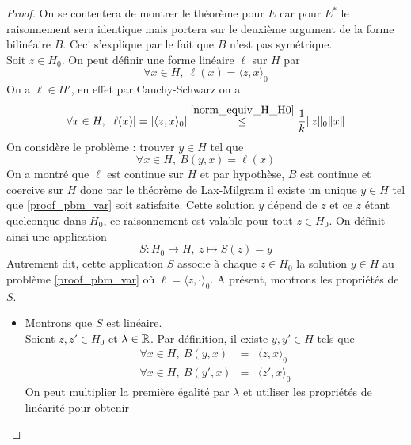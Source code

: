 \begin{appendices}
\begin{proof}
    On se contentera de montrer le théorème pour $E$ car pour $E^*$ le raisonnement sera identique mais portera sur le deuxième argument de la forme bilinéaire $B$. Ceci s'explique par le fait que $B$ n'est pas symétrique.
    \\
    Soit $z \in H_0$. On peut définir une forme linéaire $\ell$ sur $H$ par 
    \begin{equation*}
        \forall x \in H, \ \ell(x) = \langle z, x \rangle_0
    \end{equation*}
    On a $\ell \in H'$, en effet par Cauchy-Schwarz on a 
    \begin{equation*}
        \forall x \in H, \ |\ell(x)| = |\langle z, x \rangle_0| \overset{\eqref{norm_equiv_H_H0}}{\leq} \frac{1}{k}\|z\|_0 \|x\|
    \end{equation*}
    On considère le problème : trouver $y \in H$ tel que 
    \begin{equation}\label{proof_pbm_var}
        \forall x \in H, \ B(y,x) = \ell(x)
    \end{equation}
    On a montré que $\ell$ est continue sur $H$ et par hypothèse, $B$ est continue et coercive sur $H$ donc par le théorème de Lax-Milgram il existe un unique $y \in H$ tel que \eqref{proof_pbm_var} soit satisfaite. Cette solution $y$ dépend de $z$ et ce $z$ étant quelconque dans $H_0$, ce raisonnement est valable pour tout $z \in H_0$. On définit ainsi une application 
    \begin{equation*}
        S : H_0 \rightarrow H, \ z \mapsto S(z) = y
    \end{equation*}
    Autrement dit, cette application $S$ associe à chaque $z \in H_0$ la solution $y \in H$ au problème \eqref{proof_pbm_var} où $\ell = \langle z, \cdot \rangle_0$.
    A présent, montrons les propriétés de $S$.
    \begin{itemize}
        \item Montrons que $S$ est linéaire.
        \\
        Soient $z,z' \in H_0$ et $\lambda \in \mathbb{R}$. Par définition, il existe $y, y' \in H$ tels que 
        \begin{eqnarray}\label{proof_eg1}
            \forall x \in H, \ B(y,x) &=& \langle z,x \rangle_0 \nonumber \\
            \forall x \in H, \ B(y',x) &=& \langle z',x \rangle_0
        \end{eqnarray}
        On peut multiplier la première égalité par $\lambda$ et utiliser les propriétés de linéarité pour obtenir 

\end{itemize}
\end{proof}
\end{appendices}
